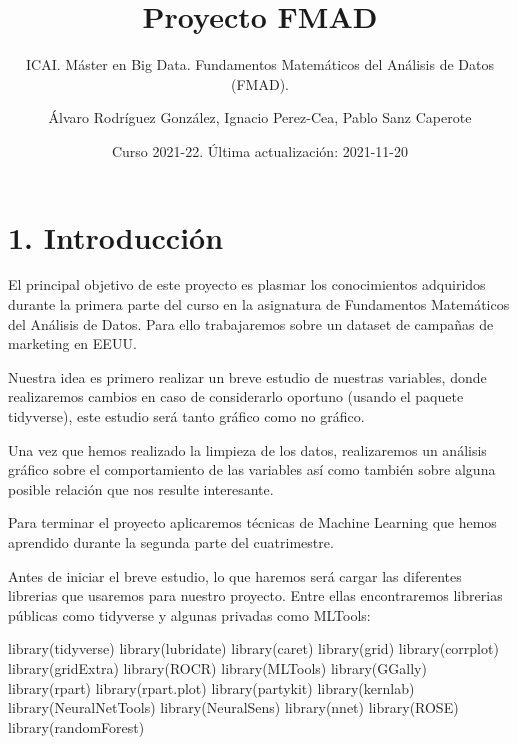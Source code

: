 \documentclass[
]{article}
\title{Proyecto FMAD}
\subtitle{ICAI. Máster en Big Data. Fundamentos Matemáticos del Análisis
de Datos (FMAD).}
\author{Álvaro Rodríguez González, Ignacio Perez-Cea, Pablo Sanz
Caperote}
\date{Curso 2021-22. Última actualización: 2021-11-20}
\newenvironment{Shaded}{\begin{snugshade}}{\end{snugshade}}
\newcommand{\FunctionTok}[1]{\textcolor[rgb]{0.00,0.00,0.00}{#1}}
\newcommand{\NormalTok}[1]{#1}
\begin{document}
\maketitle

\newpage
\tableofcontents
\newpage

\hypertarget{introducciuxf3n}{%
\section{1. Introducción}\label{introducciuxf3n}}

El principal objetivo de este proyecto es plasmar los conocimientos
adquiridos durante la primera parte del curso en la asignatura de
Fundamentos Matemáticos del Análisis de Datos. Para ello trabajaremos
sobre un dataset de campañas de marketing en EEUU.

Nuestra idea es primero realizar un breve estudio de nuestras variables,
donde realizaremos cambios en caso de considerarlo oportuno (usando el
paquete tidyverse), este estudio será tanto gráfico como no gráfico.

Una vez que hemos realizado la limpieza de los datos, realizaremos un
análisis gráfico sobre el comportamiento de las variables así como
también sobre alguna posible relación que nos resulte interesante.

Para terminar el proyecto aplicaremos técnicas de Machine Learning que
hemos aprendido durante la segunda parte del cuatrimestre.

Antes de iniciar el breve estudio, lo que haremos será cargar las
diferentes librerias que usaremos para nuestro proyecto. Entre ellas
encontraremos librerias públicas como tidyverse y algunas privadas como
MLTools:

\begin{Shaded}
\begin{Highlighting}[]
\FunctionTok{library}\NormalTok{(tidyverse)}
\FunctionTok{library}\NormalTok{(lubridate)}
\FunctionTok{library}\NormalTok{(caret)}
\FunctionTok{library}\NormalTok{(grid)}
\FunctionTok{library}\NormalTok{(corrplot)}
\FunctionTok{library}\NormalTok{(gridExtra)}
\FunctionTok{library}\NormalTok{(ROCR)}
\FunctionTok{library}\NormalTok{(MLTools)}
\FunctionTok{library}\NormalTok{(GGally)}
\FunctionTok{library}\NormalTok{(rpart)}
\FunctionTok{library}\NormalTok{(rpart.plot)}
\FunctionTok{library}\NormalTok{(partykit)}
\FunctionTok{library}\NormalTok{(kernlab)}
\FunctionTok{library}\NormalTok{(NeuralNetTools) }
\FunctionTok{library}\NormalTok{(NeuralSens)}
\FunctionTok{library}\NormalTok{(nnet)}
\FunctionTok{library}\NormalTok{(ROSE)}
\FunctionTok{library}\NormalTok{(randomForest)}
\end{Highlighting}
\end{Shaded}
\end{document}
